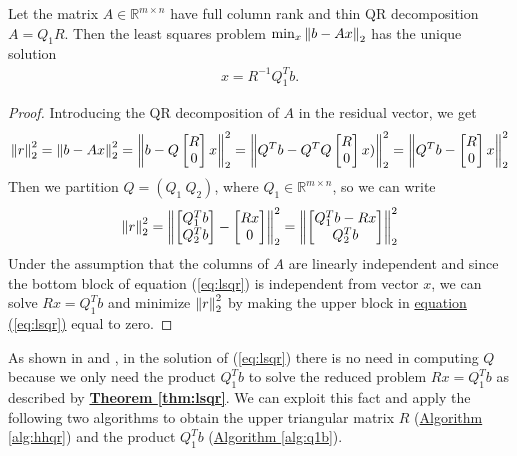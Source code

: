 \begin{thm}
\label{thm:lsqr}
Let the matrix $A\in \mathbb{R}^{m\times n}$ have full column rank and thin QR decomposition $A = Q_1R$. Then the least squares problem $\min_{x} \left\lVert b - Ax \right\rVert_2$ has the unique solution
\begin{align*}
    x = R^{-1}Q_1^Tb.
\end{align*}
\end{thm}
\begin{proof}
Introducing the QR decomposition of $A$ in the residual vector, we get
\begin{align*}
    \left\lVert r \right\rVert_2^2 = \left\lVert b - Ax \right\rVert_2^2 = \left\lVert b - Q\begin{bmatrix}R \\ 0\end{bmatrix}x \right\rVert_2^2 = \left\lVert Q^Tb-Q^TQ\begin{bmatrix}R \\ 0\end{bmatrix}x) \right\rVert_2^2 = \left\lVert Q^Tb - \begin{bmatrix}R \\ 0\end{bmatrix}x \right\rVert_2^2
\end{align*}
Then we partition $Q = (Q_1\ Q_2)$, where $Q_1\in \mathbb{R}^{m\times n}$, so we can write
\begin{equation}
\label{eq:lsqr}
    \left\lVert r \right\rVert_2^2 = \left\lVert \begin{bmatrix}Q_1^Tb \\ Q_2^Tb\end{bmatrix} - \begin{bmatrix}Rx \\ 0\end{bmatrix} \right\rVert_2^2 = \left\lVert \begin{bmatrix}Q_1^Tb - Rx \\ Q_2^Tb\end{bmatrix} \right\rVert_2^2
\end{equation}
Under the assumption that the columns of $A$ are linearly independent and since the bottom block of equation (\ref{eq:lsqr}) is independent from vector $x$, we can solve $Rx = Q_1^Tb$ and minimize $\left\lVert r \right\rVert_2^2$ by making the upper block in \hyperref[eq:lsqr]{equation (\ref{eq:lsqr})} equal to zero.
\end{proof}

As shown in \parencite[Lecture 10]{Bau} and \parencite[Chap. 5.3]{elden}, in the solution of (\ref{eq:lsqr}) there is no need in computing $Q$ because we only need the product $Q_1^Tb$ to solve the reduced problem $Rx=Q_1^Tb$ as described by \hyperref[thm:lsqr]{\textbf{Theorem \ref{thm:lsqr}}}. We can exploit this fact and apply the following two algorithms to obtain the upper triangular matrix $R$ (\hyperref[alg:hhqr]{Algorithm \ref{alg:hhqr}}) and the product $Q_1^Tb$ (\hyperref[alg:q1b]{Algorithm \ref{alg:q1b}}).

